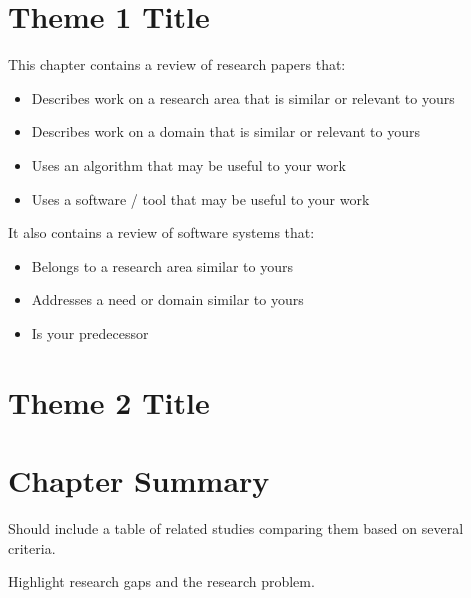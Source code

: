 \begin{comment}

%
%
Guide on Writing your RRL chapter

1. Identify the keywords with respect to your research
      One keyword = One document section
                Examples: 2.1 Story Generation Systems
			 2.2 Knowledge Representation

2.  Find references using these keywords

3.  For each of the references that you find,
        Check: Is it relevant to your research?
        Use their references to find more relevant works.

4. Identify a set of criteria for comparison.
       It will serve as a guide to help you focus on what to look for

5. Write a summary focusing on -
       What: A short description of the work
       How: A summary of the approach it utilized
       Findings: If applicable, provide the results
        Why: Relevance to your work

6. At the end of each section,  show a Table of Comparison of the related works
   and your proposed project/system

\end{comment}

\section{Theme 1 Title}
This chapter  contains a review of research papers that:
%
%
\begin{itemize}
\item Describes work on a research area that is similar or relevant to yours
\item Describes work on a domain that is similar or relevant to yours
\item Uses an algorithm that may be useful to your work
\item Uses a software / tool that may be useful to your work
\end{itemize}

It also contains a review of software systems that:
%
%
\begin{itemize}
   \item Belongs to a research area similar to yours
   \item Addresses a need or domain similar to yours
   \item Is your predecessor
\end{itemize}

\section{Theme 2 Title}

\section{Chapter Summary}
Should include a table of related studies comparing them based on several criteria.

Highlight research gaps and the research problem.

